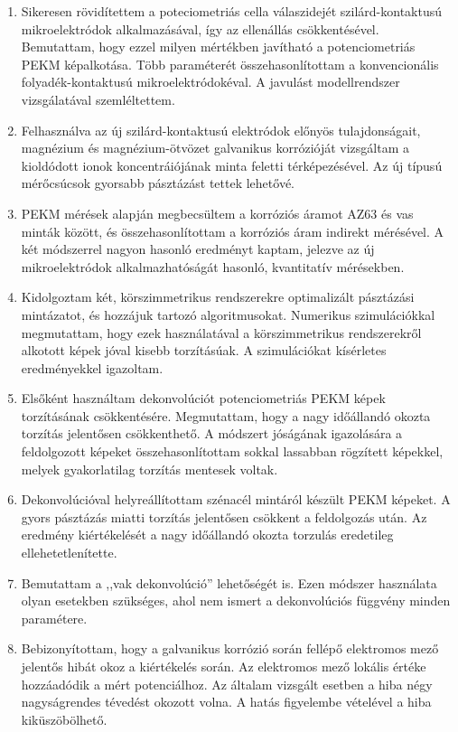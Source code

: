 \begin{enumerate}
\item Sikeresen rövidítettem a poteciometriás cella válaszidejét szilárd-kontaktusú mikroelektródok alkalmazásával, így az ellenállás csökkentésével.
Bemutattam, hogy ezzel milyen mértékben javítható a potenciometriás PEKM képalkotása.
Több paraméterét összehasonlítottam a konvencionális folyadék-kontaktusú mikroelektródokéval.
A javulást modellrendszer vizsgálatával szemléltettem.

\item Felhasználva az új szilárd-kontaktusú elektródok előnyös tulajdonságait, magnézium és magnézium-ötvözet galvanikus korrózióját vizsgáltam a kioldódott ionok koncentráiójának minta feletti térképezésével.
Az új típusú mérőcsúcsok gyorsabb pásztázást tettek lehetővé.

\item PEKM mérések alapján megbecsültem a korróziós áramot AZ63 és vas minták között, és összehasonlítottam a korróziós áram indirekt mérésével.
A két módszerrel nagyon hasonló eredményt kaptam, jelezve az új mikroelektródok alkalmazhatóságát hasonló, kvantitatív mérésekben.

\item Kidolgoztam két, körszimmetrikus rendszerekre optimalizált pásztázási mintázatot, és hozzájuk tartozó algoritmusokat.
Numerikus szimulációkkal megmutattam, hogy ezek használatával a körszimmetrikus rendszerekről alkotott képek jóval kisebb torzításúak.
A szimulációkat kísérletes eredményekkel igazoltam.

\item Elsőként használtam dekonvolúciót potenciometriás PEKM képek torzításának csökkentésére.
Megmutattam, hogy a nagy időállandó okozta torzítás jelentősen csökkenthető.
A módszert jóságának igazolására a feldolgozott képeket összehasonlítottam sokkal lassabban rögzített képekkel, melyek gyakorlatilag torzítás mentesek voltak.

\item Dekonvolúcióval helyreállítottam szénacél mintáról készült PEKM képeket.
A gyors pásztázás miatti torzítás jelentősen csökkent a feldolgozás után.
Az eredmény kiértékelését a nagy időállandó okozta torzulás eredetileg ellehetetlenítette.

\item Bemutattam a ,,vak dekonvolúció'' lehetőségét is.
Ezen módszer használata olyan esetekben szükséges, ahol nem ismert a dekonvolúciós függvény minden paramétere.

\item Bebizonyítottam, hogy a galvanikus korrózió során fellépő elektromos mező jelentős hibát okoz a kiértékelés során.
Az elektromos mező lokális értéke hozzáadódik a mért potenciálhoz.
Az általam vizsgált esetben a hiba négy nagyságrendes tévedést okozott volna.
A hatás figyelembe vételével a hiba kiküszöbölhető.
\end{enumerate}
